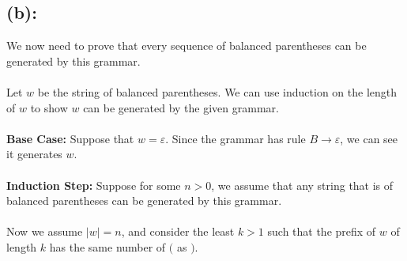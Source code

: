 \documentclass [9 pt]{article}
\theoremstyle{definition}
\begin{document}
\subsection*{(b):}
We now need to prove that every sequence of balanced parentheses can be generated by this grammar.\\
\\
Let $w$ be the string of balanced parentheses. We can use induction on the length of $w$ to show $w$ can be generated by the given grammar.\\
\\
\textbf{Base Case:} Suppose that $w = \varepsilon$. Since the grammar has rule $B \to \varepsilon$, we can see it generates $w$.\\
\\
\textbf{Induction Step:} Suppose for some $n > 0$, we assume that any string that is of balanced parentheses can be generated by this grammar.\\
\\
Now we assume $|w| = n$, and consider the least $k > 1$ such that the prefix of $w$ of length $k$ has the same number of $($ as $)$.
\end{document}

